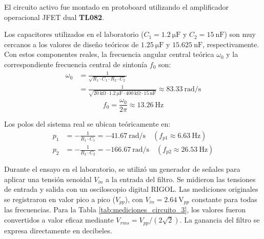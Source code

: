 El circuito activo fue montado en protoboard utilizando el amplificador operacional JFET dual \textbf{TL082}.

Los capacitores utilizados en el laboratorio ($C_1 = \SI{1.2}{\micro\farad}$ y $C_2 = \SI{15}{\nano\farad}$) son muy cercanos a los valores de diseño teóricos de $\SI{1.25}{\micro\farad}$ y $\SI{15.625}{\nano\farad}$, respectivamente. Con estos componentes reales, la frecuencia angular central teórica $\omega_0$ y la correspondiente frecuencia central de sintonía $f_0$ son:
\begin{align}
  \omega_0 &= \frac{1}{\sqrt{R_1 \cdot C_1 \cdot R_2 \cdot C_2}} \\
           &= \frac{1}{\sqrt{\SI{20}{\kilo\ohm} \cdot \SI{1.2}{\micro\farad} \cdot \SI{400}{\kilo\ohm} \cdot \SI{15}{\nano\farad}}} \approx \SI{83.33}{\radian\per\second}
\end{align}
\begin{equation}
  f_0 = \frac{\omega_0}{2\pi} \approx \SI{13.26}{\hertz}
\end{equation}

Los polos del sistema real se ubican teóricamente en:
\begin{align}
  p_1 &= -\frac{1}{R_1 \cdot C_1} = -\SI{41.67}{\radian\per\second} \quad (f_{p1} \approx \SI{6.63}{\hertz}) \\
  p_2 &= -\frac{1}{R_2 \cdot C_2} = -\SI{166.67}{\radian\per\second} \quad (f_{p2} \approx \SI{26.53}{\hertz})
\end{align}

Durante el ensayo en el laboratorio, se utilizó un generador de señales para aplicar una tensión senoidal $V_{in}$ a la entrada del filtro. Se midieron las tensiones de entrada y salida con un osciloscopio digital RIGOL. Las mediciones originales se registraron en valor pico a pico ($V_{pp}$), con $V_{in} = \SI{2.64}{\volt}_{pp}$ constante para todas las frecuencias. Para la Tabla \ref{tab:mediciones_circuito_3}, los valores fueron convertidos a valor eficaz mediante $V_{rms} = V_{pp}/(2\sqrt{2})$. La ganancia del filtro se expresa directamente en decibeles.

